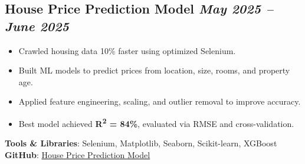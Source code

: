 \subsection*{House Price Prediction Model \hfill \textit{May 2025 – June 2025}}

\begin{itemize}
  \item Crawled housing data 10\% faster using optimized Selenium.
  \item Built ML models  to predict prices from location, size, rooms, and property age.
  \item Applied feature engineering, scaling, and outlier removal to improve accuracy.
  \item Best model achieved \textbf{R\textsuperscript{2} = 84\%}, evaluated via RMSE and cross-validation.
\end{itemize}


\textbf{Tools \& Libraries}: Selenium, Matplotlib, Seaborn,  Scikit-learn, XGBoost \\
\textbf{GitHub}: \href{https://github.com/xuanduong2711/Duong20232024_khdl}{House Price Prediction Model}
